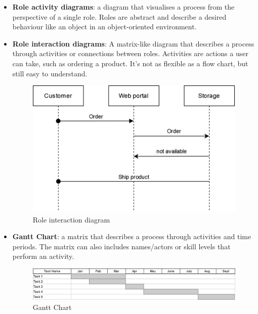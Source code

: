 \begin{itemize}
\newpage
    
    \item \textbf{Role activity diagrams}: a diagram that visualises a process from the perspective of a single role. Roles are abstract and describe a desired behaviour like an object in an object-oriented environment.
    
    \item \textbf{Role interaction diagrams}: A matrix-like diagram that describes a process through activities or connections between roles. Activities are actions a user can take, such as ordering a product. It's not as flexible as a flow chart, but still easy to understand.

    \begin{figure}[h]
    \centering
    \includegraphics[width=\textwidth/2]{images/BPMN/role_int_sample.drawio.png}
    \caption{\label{fig:bpmn_RID_chart}Role interaction diagram}
    \end{figure}
    
    \item \textbf{Gantt Chart}: a matrix that describes a process through activities and time periods. The matrix can also includes names/actors or skill levels that perform an activity.

    \begin{figure}[h]
    \centering
    \includegraphics[width=\textwidth/2]{images/BPMN/Gnatt_sample.drawio.png}
    \caption{\label{fig:bpmn_gnatt_chart}Gantt Chart}
    \end{figure}
    

\end{itemize}
